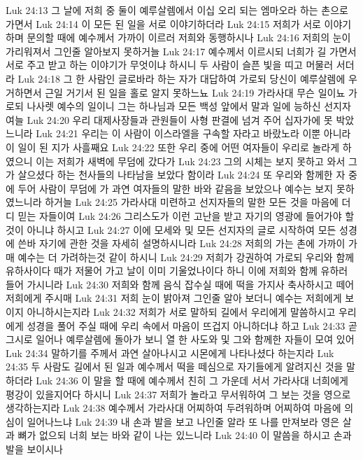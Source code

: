 Luk 24:13  그 날에 저희 중 둘이 예루살렘에서 이십 오리 되는 엠마오라 하는 촌으로 가면서
Luk 24:14  이 모든 된 일을 서로 이야기하더라
Luk 24:15  저희가 서로 이야기하며 문의할 때에 예수께서 가까이 이르러 저희와 동행하시나
Luk 24:16  저희의 눈이 가리워져서 그인줄 알아보지 못하거늘
Luk 24:17  예수께서 이르시되 너희가 길 가면서 서로 주고 받고 하는 이야기가 무엇이냐 하시니 두 사람이 슬픈 빛을 띠고 머물러 서더라
Luk 24:18  그 한 사람인 글로바라 하는 자가 대답하여 가로되 당신이 예루살렘에 우거하면서 근일 거기서 된 일을 홀로 알지 못하느뇨
Luk 24:19  가라사대 무슨 일이뇨 가로되 나사렛 예수의 일이니 그는 하나님과 모든 백성 앞에서 말과 일에 능하신 선지자여늘
Luk 24:20  우리 대제사장들과 관원들이 사형 판결에 넘겨 주어 십자가에 못 박았느니라
Luk 24:21  우리는 이 사람이 이스라엘을 구속할 자라고 바랐노라 이뿐 아니라 이 일이 된 지가 사흘째요
Luk 24:22  또한 우리 중에 어떤 여자들이 우리로 놀라게 하였으니 이는 저희가 새벽에 무덤에 갔다가
Luk 24:23  그의 시체는 보지 못하고 와서 그가 살으셨다 하는 천사들의 나타남을 보았다 함이라
Luk 24:24  또 우리와 함께한 자 중에 두어 사람이 무덤에 가 과연 여자들의 말한 바와 같음을 보았으나 예수는 보지 못하였느니라 하거늘
Luk 24:25  가라사대 미련하고 선지자들의 말한 모든 것을 마음에 더디 믿는 자들이여
Luk 24:26  그리스도가 이런 고난을 받고 자기의 영광에 들어가야 할 것이 아니냐 하시고
Luk 24:27  이에 모세와 및 모든 선지자의 글로 시작하여 모든 성경에 쓴바 자기에 관한 것을 자세히 설명하시니라
Luk 24:28  저희의 가는 촌에 가까이 가매 예수는 더 가려하는것 같이 하시니
Luk 24:29  저희가 강권하여 가로되 우리와 함께 유하사이다 때가 저물어 가고 날이 이미 기울었나이다 하니 이에 저희와 함께 유하러 들어 가시니라
Luk 24:30  저희와 함께 음식 잡수실 때에 떡을 가지사 축사하시고 떼어 저희에게 주시매
Luk 24:31  저희 눈이 밝아져 그인줄 알아 보더니 예수는 저희에게 보이지 아니하시는지라
Luk 24:32  저희가 서로 말하되 길에서 우리에게 말씀하시고 우리에게 성경을 풀어 주실 때에 우리 속에서 마음이 뜨겁지 아니하더냐 하고
Luk 24:33  곧 그시로 일어나 예루살렘에 돌아가 보니 열 한 사도와 및 그와 함께한 자들이 모여 있어
Luk 24:34  말하기를 주께서 과연 살아나시고 시몬에게 나타나셨다 하는지라
Luk 24:35  두 사람도 길에서 된 일과 예수께서 떡을 떼심으로 자기들에게 알려지신 것을 말하더라
Luk 24:36  이 말을 할 때에 예수께서 친히 그 가운데 서서 가라사대 너희에게 평강이 있을지어다 하시니
Luk 24:37  저희가 놀라고 무서워하여 그 보는 것을 영으로 생각하는지라
Luk 24:38  예수께서 가라사대 어찌하여 두려워하며 어찌하여 마음에 의심이 일어나느냐
Luk 24:39  내 손과 발을 보고 나인줄 알라 또 나를 만져보라 영은 살과 뼈가 없으되 너희 보는 바와 같이 나는 있느니라
Luk 24:40  이 말씀을 하시고 손과 발을 보이시나
